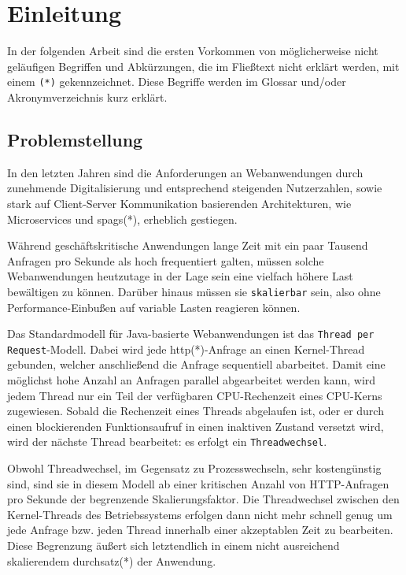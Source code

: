 \section{Einleitung}
\label{sec:einleitung}
In der folgenden Arbeit sind die ersten Vorkommen von möglicherweise nicht geläufigen Begriffen und Abkürzungen, die
im Fließtext nicht erklärt werden, mit einem \verb|(*)| gekennzeichnet.
Diese Begriffe werden im Glossar und/oder Akronymverzeichnis kurz erklärt.

\subsection{Problemstellung}
\label{subsec:problemstellung}
In den letzten Jahren sind die Anforderungen an Webanwendungen durch zunehmende Digitalisierung und entsprechend steigenden Nutzerzahlen,
sowie stark auf Client-Server Kommunikation basierenden Architekturen, wie Microservices und \Glspl{spag}(*), erheblich gestiegen.

Während geschäftskritische Anwendungen lange Zeit mit ein paar Tausend Anfragen pro Sekunde als hoch frequentiert
galten, müssen solche Webanwendungen heutzutage in der Lage sein eine vielfach höhere Last bewältigen zu können.
Darüber hinaus müssen sie \verb|skalierbar| sein, also ohne Performance-Einbußen auf variable Lasten reagieren können.

Das Standardmodell für Java-basierte Webanwendungen ist das \verb|Thread per Request|-Modell.
Dabei wird jede \acrshort{http}(*)-Anfrage an einen Kernel-Thread gebunden, welcher anschließend die Anfrage sequentiell abarbeitet.
Damit eine möglichst hohe Anzahl an Anfragen parallel abgearbeitet werden kann, wird jedem Thread nur ein Teil der verfügbaren
CPU-Rechenzeit eines CPU-Kerns zugewiesen. Sobald die Rechenzeit eines Threads abgelaufen ist, oder er durch einen blockierenden
Funktionsaufruf in einen inaktiven Zustand versetzt wird, wird der nächste Thread bearbeitet: es erfolgt ein \verb|Threadwechsel|.

Obwohl Threadwechsel, im Gegensatz zu Prozesswechseln, sehr kostengünstig sind, sind sie in diesem Modell ab einer kritischen Anzahl von HTTP-Anfragen
pro Sekunde der begrenzende Skalierungsfaktor. Die Threadwechsel zwischen den Kernel-Threads des Betriebssystems erfolgen dann nicht mehr
schnell genug um jede Anfrage bzw. jeden Thread innerhalb einer akzeptablen Zeit zu bearbeiten.
Diese Begrenzung äußert sich letztendlich in einem nicht ausreichend skalierendem \Gls{durchsatz}(*) der Anwendung.

